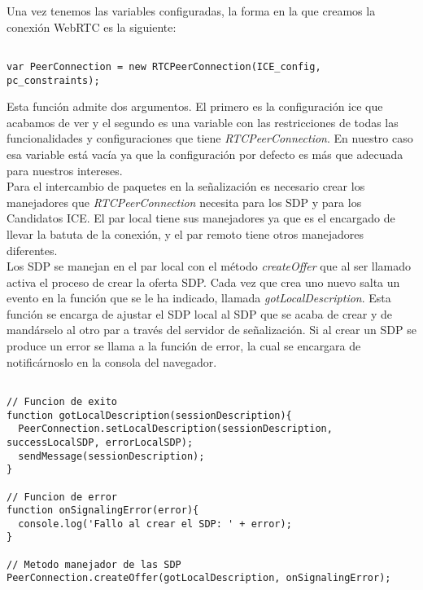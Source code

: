Una vez tenemos las variables configuradas, la forma en la que creamos la conexión WebRTC es la siguiente:\\

\begin{lstlisting}[caption=RTCPeerConnection.]

var PeerConnection = new RTCPeerConnection(ICE_config, pc_constraints);

\end{lstlisting}

Esta función admite dos argumentos. El primero es la configuración ice que acabamos de ver y el segundo es una variable con las restricciones de todas las funcionalidades y configuraciones que tiene \emph{RTCPeerConnection}. En nuestro caso esa variable está vacía ya que la configuración por defecto es más que adecuada para nuestros intereses.\\

Para el intercambio de paquetes en la señalización es necesario crear los manejadores que \emph{RTCPeerConnection} necesita para los SDP y para los Candidatos ICE. El par local tiene sus manejadores ya que es el encargado de llevar la batuta de la conexión, y el par remoto tiene otros manejadores diferentes. \\

Los SDP se manejan en el par local con el método \emph{createOffer} que al ser llamado activa el proceso de crear la oferta SDP. Cada vez que crea uno nuevo salta un evento en la función que se le ha indicado, llamada \emph{gotLocalDescription}. Esta función se encarga de ajustar el SDP local al SDP que se acaba de crear y de mandárselo al otro par a través del servidor de señalización. Si al crear un SDP se produce un error se llama a la función de error, la cual se encargara de notificárnoslo en la consola del navegador.\\


\begin{lstlisting}[caption={Manejador de los SDP.}, label={lst:manejadorsdp}]

// Funcion de exito
function gotLocalDescription(sessionDescription){
  PeerConnection.setLocalDescription(sessionDescription, successLocalSDP, errorLocalSDP);
  sendMessage(sessionDescription);
}

// Funcion de error
function onSignalingError(error){
  console.log('Fallo al crear el SDP: ' + error);	
}

// Metodo manejador de las SDP
PeerConnection.createOffer(gotLocalDescription, onSignalingError);

\end{lstlisting}

